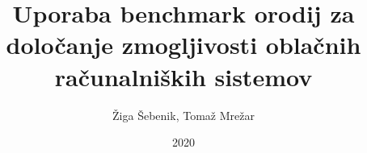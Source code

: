 \documentclass[slovene]{book}
\begin{document}
\author{Žiga Šebenik, Tomaž Mrežar}
\title{Uporaba benchmark orodij za določanje zmogljivosti oblačnih računalniških sistemov}
\date{2020}
\maketitle

\frontmatter
\tableofcontents


\mainmatter

 
% 

\backmatter
%
%
\printindex %
\end{document}
